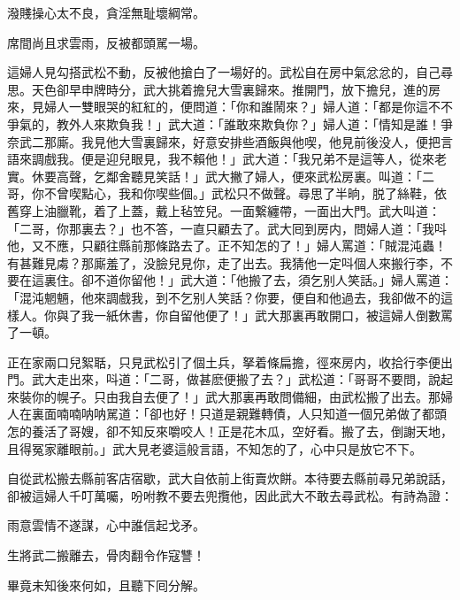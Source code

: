 \begin{myquote}
潑賤操心太不良，貪淫無耻壞綱常。

席間尚且求雲雨，反被都頭駡一場。
\end{myquote}

這婦人見勾搭武松不動，反被他搶白了一場好的。武松自在房中氣忿忿的，自己尋思。天色卻早申牌時分，武大挑着擔兒大雪裏歸來。推開門，放下擔兒，進的房來，見婦人一雙眼哭的紅紅的，便問道：「你和誰鬧來？」婦人道：「都是你這不不爭氣的，教外人來欺負我！」武大道：「誰敢來欺負你？」婦人道：「情知是誰！爭奈武二那廝。我見他大雪裏歸來，好意安排些酒飯與他喫，他見前後没人，便把言語來調戲我。便是迎兒眼見，我不賴他！」武大道：「我兄弟不是這等人，從來老實。休要高聲，乞鄰舍聽見笑話！」武大撇了婦人，便來武松房裏。叫道：「二哥，你不曾喫點心，我和你喫些個。」武松只不做聲。尋思了半晌，脱了絲鞋，依舊穿上油臘靴，着了上蓋，戴上毡笠兒。一面繋纏帶，一面出大門。武大叫道：「二哥，你那裏去？」也不答，一直只顧去了。武大囘到房内，問婦人道：「我呌他，又不應，只顧往縣前那條路去了。正不知怎的了！」婦人罵道：「賊混沌蟲！有甚難見䖏？那廝羞了，没臉兒見你，走了出去。我猜他一定呌個人來搬行李，不要在這裏住。卻不道你留他！」武大道：「他搬了去，須乞别人笑話。」婦人罵道：「混沌魍魎，他來調戲我，到不乞别人笑話？你要，便自和他過去，我卻做不的這樣人。你與了我一紙休書，你自留他便了！」武大那裏再敢開口，被這婦人倒數罵了一頓。

正在家兩口兒絮聒，只見武松引了個土兵，拏着條扁擔，徑來房内，收拾行李便出門。武大走出來，呌道：「二哥，做甚麽便搬了去？」武松道：「哥哥不要問，說起來裝你的幌子。只由我自去便了！」武大那裏再敢問備細，由武松搬了出去。那婦人在裏面喃喃呐呐駡道：「卻也好！只道是親難轉債，人只知道一個兄弟做了都頭怎的養活了哥嫂，卻不知反來嚼咬人！正是花木瓜，空好看。搬了去，倒謝天地，且得冤家離眼前。」武大見老婆這般言語，不知怎的了，心中只是放它不下。

自從武松搬去縣前客店宿歇，武大自依前上街賣炊餅。本待要去縣前尋兄弟說話，卻被這婦人千叮萬囑，吩咐教不要去兜攬他，因此武大不敢去尋武松。有詩為證：

\begin{myquote}
雨意雲情不遂謀，心中誰信起戈矛。

生將武二搬離去，骨肉翻令作寇讐！
\end{myquote}

畢竟未知後來何如，且聽下囘分解。

